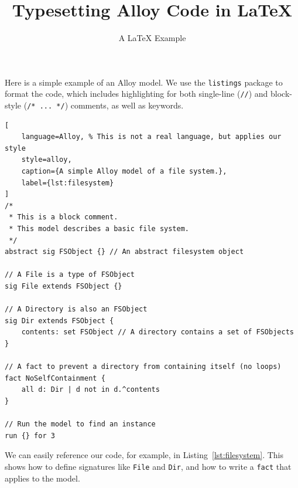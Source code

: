 \documentclass[11pt, a4paper]{article}
\begin{document}
\title{Typesetting Alloy Code in \LaTeX}
\author{A \LaTeX{} Example}
\date{}
\maketitle

Here is a simple example of an Alloy model. We use the \texttt{listings} package to format the code, which includes highlighting for both single-line (\texttt{//}) and block-style (\texttt{/* ... */}) comments, as well as keywords.

\begin{lstlisting}[
    language=Alloy, % This is not a real language, but applies our style
    style=alloy,
    caption={A simple Alloy model of a file system.},
    label={lst:filesystem}
]
/*
 * This is a block comment.
 * This model describes a basic file system.
 */
abstract sig FSObject {} // An abstract filesystem object

// A File is a type of FSObject
sig File extends FSObject {}

// A Directory is also an FSObject
sig Dir extends FSObject {
    contents: set FSObject // A directory contains a set of FSObjects
}

// A fact to prevent a directory from containing itself (no loops)
fact NoSelfContainment {
    all d: Dir | d not in d.^contents
}

// Run the model to find an instance
run {} for 3
\end{lstlisting}

We can easily reference our code, for example, in Listing~\ref{lst:filesystem}. This shows how to define signatures like \texttt{File} and \texttt{Dir}, and how to write a \texttt{fact} that applies to the model.
\end{document}
